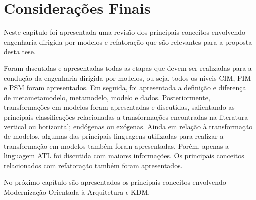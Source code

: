\section{Considerações Finais}\label{capitulobaclCOnsideracoesFinais}

Neste capítulo foi apresentada uma revisão dos principais conceitos envolvendo engenharia dirigida por modelos e refatoração que são relevantes para a proposta desta tese. 

Foram discutidas e apresentadas todas as etapas que devem ser realizadas para a condução da engenharia dirigida por modelos, ou seja, todos os níveis CIM, PIM e PSM foram apresentados. Em seguida, foi apresentada a definição e diferença de metametamodelo, metamodelo, modelo e dados. Posteriormente, transformações em modelos foram apresentadas e discutidas, salientando as principais classificações relacionadas a transformações encontradas na literatura - vertical ou horizontal; endógenas ou exógenas. Ainda em relação à transformação de modelos, algumas das principais linguagens utilizadas para realizar a transformação em modelos também foram apresentadas. Porém, apenas a linguagem ATL foi discutida com maiores informações. Os principais conceitos relacionados com refatoração também foram apresentados.

No próximo capítulo são apresentados os principais conceitos envolvendo Modernização Orientada à Arquitetura e KDM.
